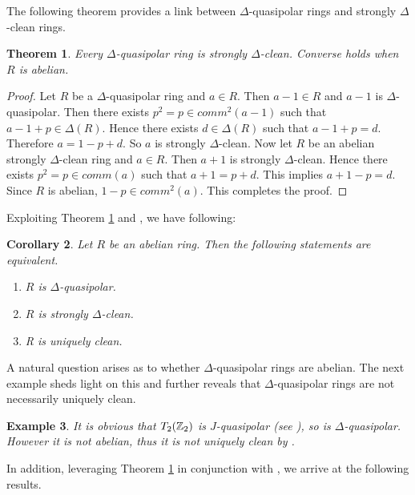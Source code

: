 \documentclass[12pt, reqno]{amsart}
\newtheorem{thm}{Theorem}[section]
\newtheorem{cor}[thm]{Corollary}
\newtheorem{exam}[thm]{Example}
\numberwithin{equation}{section}
\begin{document}
The following theorem provides a link between 
$\Delta$-quasipolar rings and 
strongly $\Delta$-clean rings.

\begin{thm}\label{stdelta}
    Every $\Delta$-quasipolar ring is strongly $\Delta$-clean. Converse holds when $R$ is abelian.
\end{thm}

\begin{proof}
    Let $R$ be a $\Delta$-quasipolar ring and $a\in R$. Then $a-1\in R$ and $a-1$ is $\Delta$-quasipolar. Then there exists $p^2=p\in comm^2(a-1)$ such that $a-1+p\in \Delta (R)$.  Hence there exists $d\in \Delta(R)$ such that $a-1+p=d$. Therefore $a=1-p+d$. So $a$ is strongly $\Delta$-clean. Now let $R$ be an abelian strongly $\Delta$-clean ring and $a\in R$. Then $a+1$ is strongly $\Delta$-clean. Hence there exists $p^2=p\in comm(a)$ such that $a+1=p+d$. This implies $a+1-p=d$. Since $R$ is abelian, $1-p\in comm^2(a)$. This completes the proof.
\end{proof}


Exploiting Theorem \ref{stdelta} and \cite[Corollary 4.3]{Danchev}, we have following:

\begin{cor}\label{TnR}
    Let $R$ be an abelian ring. Then the following statements are equivalent.
    \begin{enumerate}
        \item $R$ is $\Delta$-quasipolar.
        \item $R$ is strongly $\Delta$-clean.
        \item R is uniquely clean.
    
    \end{enumerate}
\end{cor}

A natural question arises as to whether 
$\Delta$-quasipolar rings are abelian. The next example sheds light on this and further reveals that 
$\Delta$-quasipolar rings are not necessarily uniquely clean.


\begin{exam}\label{counterex}
   {\rm It is obvious that $T_2(\Bbb{Z}_2)$ is $J$-quasipolar (see \cite{Cui}), so is $\Delta$-quasipolar. However it is not abelian, thus it is not uniquely clean by \cite[Theorem 2.1]{Chen}.}
\end{exam}
In addition, leveraging Theorem \ref{stdelta} in conjunction with \cite[Theorem 3.4]{Danchev}, we arrive at the following results.
\end{document}
